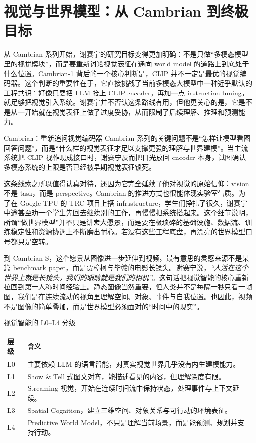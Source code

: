 \section{视觉与世界模型：从 Cambrian 到终极目标}

从 Cambrian 系列开始，谢赛宁的研究目标变得更加明确：不是只做“多模态模型里的视觉模块”，而是要重新讨论视觉表征在通向 world model 的道路上到底处于什么位置。Cambrian-1 背后的一个核心判断是，CLIP 并不一定是最优的视觉编码器。这个判断的重要性在于，它直接挑战了当前多模态大模型中一种近乎默认的工程共识：好像只要把 LLM 接上 CLIP encoder，再加一点 instruction tuning，就足够把视觉引入系统。谢赛宁并不否认这条路线有用，但他更关心的是，它是不是从一开始就在视觉表征上做了过度妥协，从而限制了后续理解、推理和预测能力。

\begin{knowledgebox}{Cambrian：重新追问视觉编码器}
Cambrian 系列的关键问题不是“怎样让模型看图回答问题”，而是“什么样的视觉表征才足以支撑更强的理解与世界建模”。当主流系统把 CLIP 视作现成接口时，谢赛宁反而把目光放回 encoder 本身，试图确认多模态系统的上限是否已经被早期视觉表征锁死。
\end{knowledgebox}

这条线索之所以值得认真对待，还因为它完全延续了他对视觉的原始信仰：vision 不是 task，而是 perspective。Cambrian 的推进方式也很能体现实验室气质。为了在 Google TPU 的 TRC 项目上搭 infrastructure，学生们挣扎了很久，谢赛宁中途甚至劝一个学生先回去继续别的工作，再慢慢把系统搭起来。这个细节说明，所谓“做世界模型”并不只是讲宏大愿景，而是要在极琐碎的基础设施、数据流、训练稳定性和资源协调上不断磨出耐心。若没有这些工程底盘，再漂亮的世界模型口号都只是空转。

到 Cambrian-S，这个愿景从图像进一步延伸到视频。最有意思的灵感来源不是某篇 benchmark paper，而是贾樟柯与毕赣的电影长镜头。谢赛宁说，\textit{``人活在这个世界上就是长镜头，我们的眼睛就是我们的相机''}。这句话把视觉智能的核心重新拉回到第一人称时间经验上。静态图像当然重要，但人类并不是每隔一秒只看一帧图，我们是在连续流动的视角里理解空间、对象、事件与自我位置。也因此，视频不是图像的简单叠加，而是世界模型必须面对的“时间中的现实”。

\begin{importantbox}{视觉智能的 L0--L4 分级}
\begin{tabularx}{\textwidth}{>{\raggedright\arraybackslash}p{} Y}
\toprule
层级 & 含义 \\
\midrule
L0 & 主要依赖 LLM 的语言智能，对真实视觉世界几乎没有内生建模能力。 \\
L1 & Show \& Tell 式图文对齐，能描述看见的内容，但理解深度有限。 \\
L2 & Streaming 视觉，开始在连续时间流中保持状态，处理事件与上下文延续。 \\
L3 & Spatial Cognition，建立三维空间、对象关系与可行动的环境表征。 \\
L4 & Predictive World Model，不只是理解当前场景，而是能预测、规划并支持行动。 \\
\bottomrule
\end{tabularx}
\end{importantbox}

